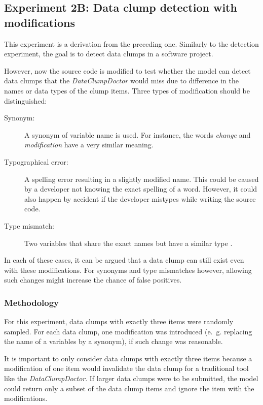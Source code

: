 \subsection{Experiment 2B: Data clump detection with modifications}

This experiment is a derivation from the preceding one. Similarly to the detection experiment, the goal is to detect data clumps in a software project.

However, now the source code is modified to test whether the model can detect data clumps that the \textit{DataClumpDoctor} would miss due to difference in the names or data types of the clump items. Three types of modification should be distinguished:

\begin{description}
    \item[Synonym:] A synonym of variable name is used. For instance, the words \textit{change} and \textit{modification} have a very similar  meaning. 

    \item[Typographical error:] A spelling error resulting in a slightly modified name. This could be caused by a developer not knowing the exact spelling of a word. However, it could also happen by accident if the developer mistypes while writing the source code.

    \item [Type mismatch:] Two variables that share the exact names but have a similar type .
\end{description}

In each of these cases, it can be argued that a data clump can still exist even with these modifications. For synonyms and type mismatches however, allowing such changes might increase the chance of false positives. 

\subsubsection{Methodology}

For this experiment, data clumps with exactly three items were randomly sampled. For each data clump, one modification was introduced (e.~g. replacing the name of a variables by a synonym), if such change was reasonable.

It is important to only consider data clumps with exactly three items because  a modification of one item would invalidate the data clump for a traditional tool like the \textit{DataClumpDoctor}. If larger data clumps were to be submitted, the model could return only a subset of the data clump items and ignore the item with the modifications. 

